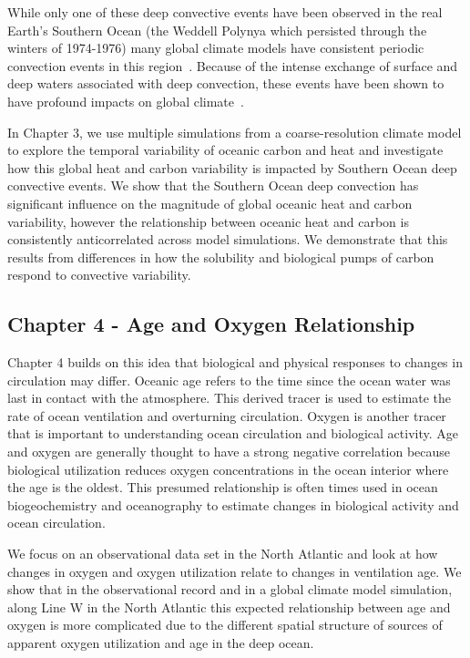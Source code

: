 While only one of these deep convective events have been observed in the real
Earth's Southern Ocean (the Weddell Polynya which persisted through the winters
of 1974-1976) many global climate models have consistent periodic convection
events in this region~\citep{DeLavergne2014a}. Because of the intense exchange
of surface and deep waters associated with deep convection, these events have
been shown to have profound impacts on global climate~\citep{Gordon1982,Cabre}.

In Chapter 3, we use multiple simulations from a coarse-resolution climate model
to explore the temporal variability of oceanic carbon and heat and investigate
how this global heat and carbon variability is impacted by Southern Ocean deep
convective events. We show that the Southern Ocean deep convection has significant
influence on the magnitude of global oceanic heat and carbon variability, however
the relationship between oceanic heat and carbon is consistently anticorrelated
across model simulations. We demonstrate that this results from differences in how
the solubility and biological pumps of carbon respond to convective variability.

\subsection{Chapter 4 - Age and Oxygen Relationship}
Chapter 4 builds on this idea that biological and physical responses to changes
in circulation may differ. Oceanic age refers to the time since the ocean water
was last in contact with the atmosphere. This derived tracer is used to estimate
the rate of ocean ventilation and overturning circulation. Oxygen is another
tracer that is important to understanding ocean circulation and biological activity.
Age and oxygen are generally thought to have a strong negative correlation because
biological utilization reduces oxygen concentrations in the ocean interior where
the age is the oldest. This presumed relationship is often times used in ocean
biogeochemistry and oceanography to estimate changes in biological activity and
ocean circulation.

We focus on an observational data set in the North Atlantic and look at how
changes in oxygen and oxygen utilization relate to changes in ventilation age.
We show that in the observational record and in a global climate model simulation,
along Line W in the North Atlantic this expected relationship between age and oxygen
is more complicated due to the different spatial structure of sources of apparent
oxygen utilization and age in the deep ocean.


